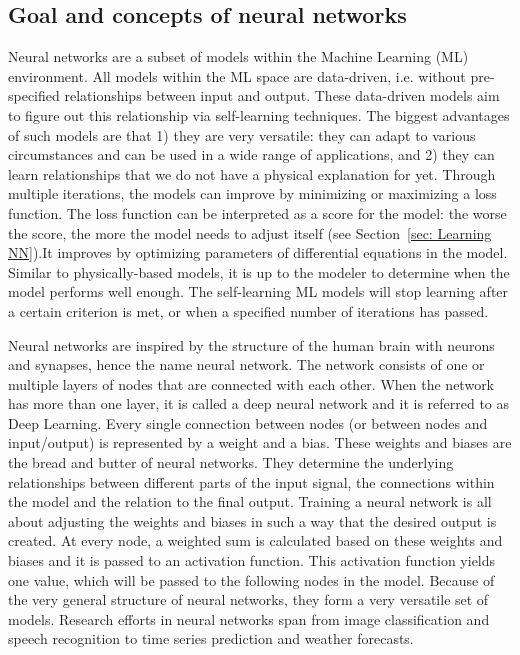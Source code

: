 \documentclass[twocolumn, 10pt, a4paper]{memoir}
\begin{document}
	\subsection{Goal and concepts of neural networks} \label{sec: NNConcepts}
	Neural networks are a subset of models within the Machine Learning (ML) environment. All models within the ML space are data-driven, i.e. without pre-specified relationships between input and output. These data-driven models aim to figure out this relationship via self-learning techniques.
	The biggest advantages of such models are that 1) they are very versatile: they can adapt to various circumstances and can be used in a wide range of applications, and 2) they can learn relationships that we do not have a physical explanation for yet. Through multiple iterations, the models can improve by minimizing or maximizing a loss function. The loss function can be interpreted as a score for the model: the worse the score, the more the model needs to adjust itself (see Section~\ref{sec: Learning NN}).It improves by optimizing parameters of differential equations in the model. Similar to physically-based models, it is up to the modeler to determine when the model performs well enough. The self-learning ML models will stop learning after a certain criterion is met, or when a specified number of iterations has passed.
	
	Neural networks are inspired by the structure of the human brain with neurons and synapses, hence the name neural network. The network consists of one or multiple layers of nodes that are connected with each other. When the network has more than one layer, it is called a deep neural network and it is referred to as Deep Learning. Every single connection between nodes (or between nodes and input/output) is represented by a weight and a bias. These weights and biases are the bread and butter of neural networks. They determine the underlying relationships between different parts of the input signal, the connections within the model and the relation to the final output. Training a neural network is all about adjusting the weights and biases in such a way that the desired output is created. At every node, a weighted sum is calculated based on these weights and biases and it is passed to an activation function. This activation function yields one value, which will be passed to the following nodes in the model.
	Because of the very general structure of neural networks, they form a very versatile set of models. Research efforts in neural networks span from image classification and speech recognition to time series prediction and weather forecasts.
	
\end{document}
